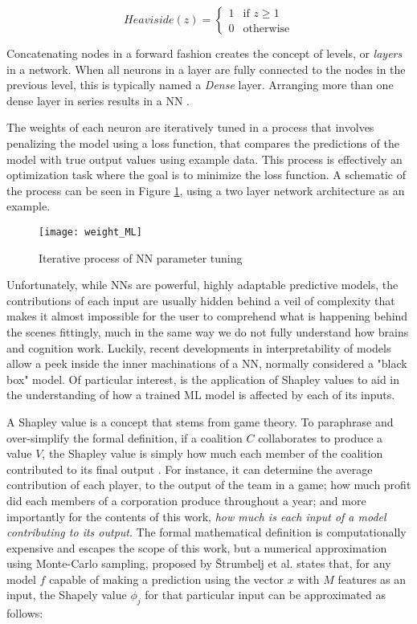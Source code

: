 \documentclass[main.tex]{subfiles}
\begin{document}
\begin{equation} \label{eq:heav}
	Heaviside(z) = \begin{cases}
		1 & \text{if } z \geq 1\\
		0 & \text{otherwise}
	\end{cases}
\end{equation}


Concatenating nodes in a forward fashion creates the concept of levels, or \emph{layers} in a network. When all neurons in a layer are fully connected to the nodes in the previous level, this is typically named a \emph{Dense} layer. Arranging more than one dense layer in series results in a NN \cite{Chollet2018, Geron2019}. 

The weights of each neuron are iteratively tuned in a process that involves penalizing the model using a loss function, that compares the predictions of the model with true output values using example data. This process is effectively an optimization task where the goal is to minimize the loss function. A schematic of the process can be seen in Figure \ref{fig:NN_it}, using a two layer network architecture as an example.

\begin{figure}[!htbp]
	\center
	\texttt{[image: weight\_ML]}
	\caption{Iterative process of NN parameter tuning \cite{Chollet2018}} \label{fig:NN_it}
\end{figure}

Unfortunately, while NNs are powerful, highly adaptable predictive models, the contributions of each input are usually hidden behind a veil of complexity that makes it almost impossible for the user to comprehend what is happening behind the scenes \textemdash fittingly, much in the same way we do not fully understand how brains and cognition work. Luckily, recent developments in interpretability of models allow a peek inside the inner machinations of a NN, normally considered a "black box" model. Of particular interest, is the application of Shapley values to aid in the understanding of how a trained ML model is affected by each of its inputs.

A Shapley value is a concept that stems from game theory. To paraphrase and over-simplify the formal definition, if a coalition $C$ collaborates to produce a value $V$, the Shapley value is simply how much each member of the coalition contributed to its final output \cite{Shapley+2016+307+318, Molnar2021}. For instance, it can determine the average contribution of each player, to the output of the team in a game; how much profit did each members of a corporation produce throughout a year; and more importantly for the contents of this work, \emph{how much is each input of a model contributing to its output}. The formal mathematical definition is computationally expensive and escapes the scope of this work, but a numerical approximation using Monte-Carlo sampling, proposed by \v{S}trumbelj et al. \cite{Strumbelj2014} states that, for any model $f$ capable of making a prediction using the vector $x$ with $M$ features as an input, the Shapely value ${\phi}_{j}$ for that particular input can be approximated as follows:
\end{document}
